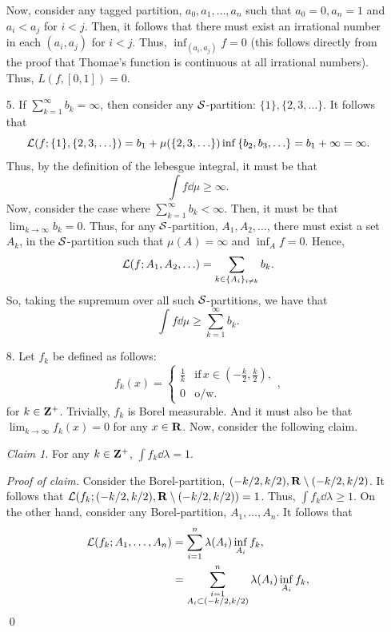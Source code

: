 \documentclass{article}
\theoremstyle{remark}
\newtheorem{claim}{Claim}
\newenvironment{poc}{\textit{Proof of claim.}}{\qed\\}
\begin{document}
\begin{enumerate}[leftmargin=*]
    Now, consider any tagged partition, $a_0, a_1, \ldots, a_n$ such that $a_0 = 0, a_n = 1$ and $a_i < a_j$ for $i < j$. 
    Then, it follows that there must exist an irrational number in each $(a_i, a_j)$ for $i < j$. Thus, 
    $\inf_{(a_i,a_j)} f = 0$ (this follows directly from the proof that Thomae's function is continuous at all irrational numbers).
    Thus, $L(f,[0,1]) = 0$. 
    \item[5.] If $\sum_{k=1}^\infty b_k = \infty$, then consider any $\mathcal{S}$-partition: $\{1\}, \{2,3,\ldots\}$.
    It follows that 
    \[
        \mathcal{L}(f; \{1\}, \{2,3,\ldots\}) = b_1 + \mu(\{2,3,\ldots\})\inf {\{b_2,b_3,\ldots\}} = b_1 + \infty = \infty.
    \]
    Thus, by the definition of the lebesgue integral, it must be that 
    \[
        \int f \dd\mu \geq \infty.   
    \]
    Now, consider the case where $\sum_{k=1}^\infty b_k < \infty$. Then, it must be that $\lim_{k\to\infty} b_k = 0$. 
    Thus, for any $\mathcal{S}$-partition, $A_1, A_2,\ldots$, there must exist a set $A_k$, in the $\mathcal{S}$-partition such that $\mu(A) = \infty$
    and $\inf_A f = 0$. Hence, 
    \[
        \mathcal{L}(f;A_1,A_2,\ldots) = \sum_{k \in \{A_i\}_{i\neq k}} b_k.
    \]
    So, taking the supremum over all such $\mathcal{S}$-partitions, we have that 
    \[
        \int f \dd\mu \geq \sum_{k=1}^\infty b_k.
    \]
    \item[8.] Let $f_k$ be defined as follows:
    \[
        f_k(x) = \begin{cases}\frac{1}{k} &\text{if}\,x\in \left(-\frac{k}{2}, \frac{k}{2}\right), \\ 0 &\text{o/w}.\end{cases},
    \]
    for $k\in\mathbf{Z}^+$. Trivially, $f_k$ is Borel measurable. And it must also be that $\lim_{k\to\infty} f_k(x) = 0$ for any $x\in\mathbf{R}$. Now,
    consider the following claim.
    \begin{claim}
        For any $k\in\mathbf{Z}^+$, $\int f_k \dd\lambda = 1$. 
    \end{claim}
    \begin{poc}
        Consider the Borel-partition, $(-k/2, k/2), \mathbf{R} \setminus (-k/2, k/2)$. It follows that $\mathcal{L}(f_k; (-k/2, k/2), \mathbf{R} \setminus (-k/2, k/2)) = 1$.
        Thus, $\int f_k \dd\lambda \geq 1$. On the other hand, consider any Borel-partition, $A_1, \ldots, A_n$. It follows that 
        \begin{align*}
            \cL(f_k; A_1,\ldots,A_n) &= \sum_{i=1}^n \lambda(A_i)\inf_{A_i} f_k, \\
            &= \sum_{\substack{i = 1 \\ A_i \subset (-k/2,k/2)}}^n \lambda(A_i)\inf_{A_i} f_k, \\

\end{align*}
\end{poc}
\end{enumerate}
\end{document}
